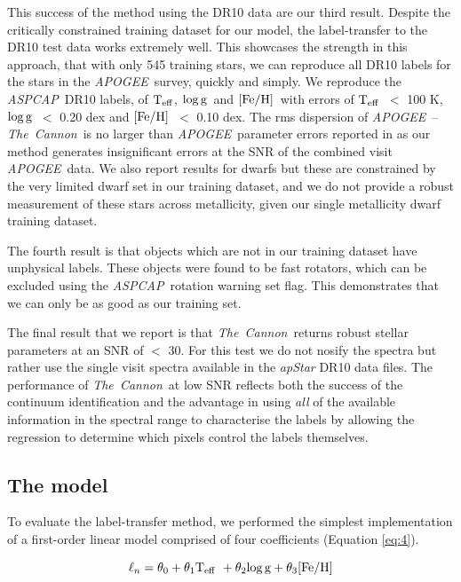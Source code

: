 \documentclass[12pt, preprint]{aastex}
\newcommand{\teff}{\mbox{$\rm T_{eff}$}}
\newcommand{\feh}{\mbox{$\rm [Fe/H]$}}
\newcommand{\logg}{\mbox{$\rm \log g$}}
\newcommand{\tc}{\textsl{The~Cannon}}
\newcommand{\apogee}{\textsl{APOGEE}}
\newcommand{\aspcap}{\textsl{ASPCAP}}
\begin{document}
This success of the method using the DR10 data are our third result. 
Despite the critically constrained training dataset for our model, the label-transfer to the DR10 test data works extremely well.
This showcases the strength in this approach, that with only 545 training stars, we can reproduce all DR10 labels for the stars in the \apogee\ survey, quickly and simply.  
We reproduce the \aspcap\ DR10 labels, of \teff, \logg\ and \feh\ with errors of \teff\ $<$ 100 K, \logg\ $<$ 0.20 dex and \feh\ $<$ 0.10 dex. 
The rms dispersion of \apogee\ -- \tc\ is no larger than \apogee\ parameter errors reported in \citep{Meszaros2013} as our method generates insignificant errors at the SNR of the combined visit \apogee\ data.
We also report results for dwarfs but these are constrained by the very limited dwarf set in our training dataset, and we do not provide a robust measurement of these stars across metallicity, given our single metallicity dwarf training dataset.

The fourth result is that objects which are not in our training dataset have unphysical labels. 
These objects were found to be fast rotators, which can be excluded using the \aspcap\ rotation warning set flag. 
This demonstrates that we can only be as good as our training set. 

The final result that we report is that \tc\ returns robust stellar parameters at an SNR of $<$ 30. 
For this test we do not nosify the spectra but rather use the single visit spectra available in the \textit{apStar} DR10 data files. 
The performance of \tc\ at low SNR reflects both the success of the continuum identification and the advantage in using \textit{all} of the available information in the spectral range to characterise the labels by allowing the regression to determine which pixels control the labels themselves.


\subsection{The model} 

To evaluate the label-transfer method, we performed the simplest implementation of a first-order linear model comprised of four coefficients (Equation \ref{eq:4}). 

\begin{equation}
\ell_n = \theta_0 + \theta_1 \teff\ + \theta_2 \logg + \theta_3 \feh 
 \label{eq:4}
 \end{equation}
\end{document}
